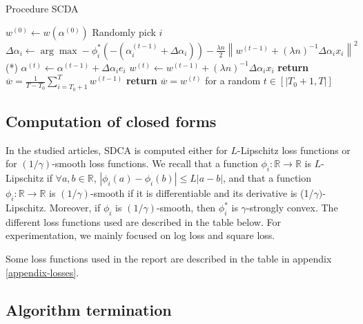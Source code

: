 \documentclass{article}
\newcommand{\abs}[1]{\left|#1\right|}
\newcommand{\norm}[1]{\left\|#1 \right\|}
\begin{document}
\begin{algorithm}[H]
    \caption{Procedure SCDA}
    \begin{algorithmic}
        \State $w^{(0)} \gets w(\alpha^{(0)})$
        \State Randomly pick $i$
        \State $\Delta \alpha_i \gets \arg \max -\phi^{*}_i(-(\alpha_i^{(t-1)}+\Delta \alpha_i))-\frac{\lambda n}{2}\norm{w^{(t-1)}+(\lambda n)^{-1}\Delta \alpha_i x_i}^2$ \qquad \qquad \qquad \qquad \qquad (*)
        \State $\alpha^{(t)} \gets \alpha^{(t-1)} + \Delta \alpha_i e_i$
        \State $w^{(t)} \gets w^{(t-1)} + (\lambda n)^{-1} \Delta \alpha_i x_i$
        \EndFor
        \State \textbf{return} $\overline{w} = \frac{1}{T-T_0} \sum_{i = T_0+1}^T w^{(t-1)}$
        \EndIf
        \State \textbf{return} $\overline{w} = w^{(t)}$ for a random $t \in [|T_0+1, T|]$
        \EndIf
        \EndProcedure
    \end{algorithmic}
\end{algorithm}


\subsection{Computation of closed forms}

\hspace{2em}
In the studied articles, SDCA is computed either for $L$-Lipschitz loss functions or for $(1/\gamma)$-smooth loss functions.
We recall that a function $\phi_i : \mathbb{R} \rightarrow \mathbb{R}$ is $L$-Lipschitz if $\forall a,b \in \mathbb{R}$, $\abs{\phi_i(a)-\phi_i(b)} \leq L \abs{a-b}$, and that a function $\phi_i : \mathbb{R} \rightarrow \mathbb{R}$ is $(1/\gamma)$-smooth if it is differentiable and its derivative is (1/$\gamma)$-Lipschitz.
Moreover, if $\phi_i$ is $(1/\gamma)$-smooth, then $\phi_i^{*}$ is $\gamma$-strongly convex.
The different loss functions used are described in the table below.
For experimentation, we mainly focused on log loss and square loss.

\hspace{2em}
Some loss functions used in the report are described in the table in appendix \ref{appendix-losses}.

\subsection{Algorithm termination}
\end{document}
